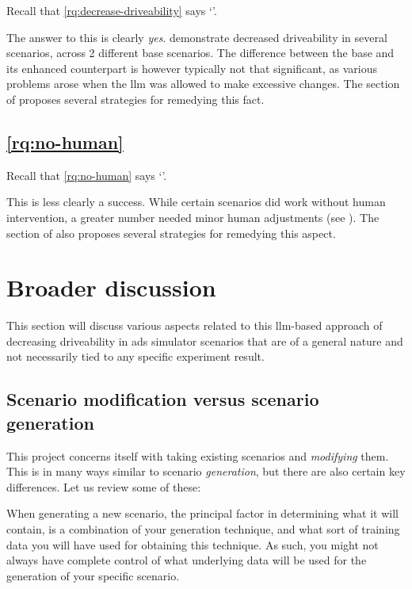 Recall that \ref{rq:decrease-driveability} says `'.

The answer to this is clearly \emph{yes}.  demonstrate
decreased driveability in several scenarios, across 2 different base scenarios. The difference between the
base and its enhanced counterpart is however typically not that significant, as various problems
arose when the \acrshort{llm} was allowed to make excessive changes. The  section of
 proposes several strategies for remedying this fact.

\subsection{\ref{rq:no-human}}

Recall that \ref{rq:no-human} says `'.

This is less clearly a success. While
certain scenarios did work without human intervention, a greater number needed minor human
adjustments (see ). The  section of  also proposes several strategies for remedying this aspect.


\section{Broader discussion}

This section will discuss various aspects related to this \acrshort{llm}-based approach of
decreasing driveability in \acrshort{ads} simulator scenarios that are of a general nature
and not necessarily tied to any specific experiment result.

\subsection{Scenario modification versus scenario generation}

This project concerns itself with taking existing scenarios and \emph{modifying} them. This is in
many ways similar to scenario \emph{generation}, but there are also certain key differences. Let us
review some of these:

When generating a new scenario, the principal factor in determining what it will contain, is a
combination of your generation technique, and what sort of training data you will have used for
obtaining this technique. As such, you might not always have complete control of what underlying
data will be used for the generation of your specific scenario.

